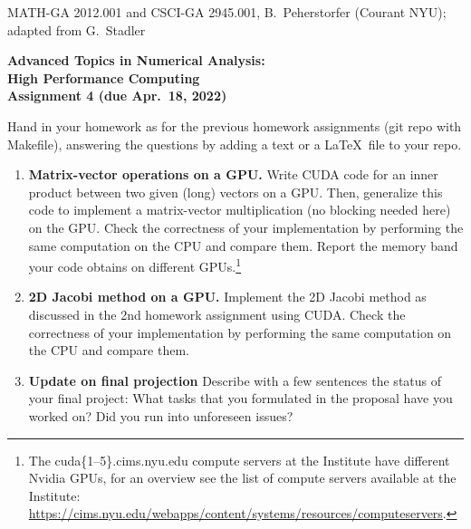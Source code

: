 \documentclass[12pt]{article}
\begin{document}
\begin{center}
  \vspace*{-2cm}
{\small MATH-GA 2012.001 and CSCI-GA 2945.001, B.~Peherstorfer (Courant NYU); adapted from G.~Stadler}\end{center}
\vspace*{.5cm}
\begin{center}
\large \textbf{%
Advanced Topics in Numerical Analysis: \\
High Performance Computing \\
Assignment 4 (due Apr.\ 18, 2022) }
\end{center}



 Hand in your homework as for
the previous homework assignments (git repo with Makefile), answering
the questions by adding a text or a \LaTeX\ file to your repo.
\\[.2ex]

\begin{enumerate}

\item {\bf Matrix-vector operations on a GPU.} Write CUDA code for an inner product between two given
  (long) vectors on a GPU. Then, generalize this code to implement a
  matrix-vector multiplication (no blocking needed here) on the
  GPU. Check the correctness of your implementation by performing the same
  computation on the CPU and compare them. Report the memory band your
  code obtains
  on different GPUs.\footnote{The cuda\{1--5\}.cims.nyu.edu compute servers at
  the Institute have different Nvidia GPUs, for an overview see the list of
  compute servers available at the Institute:
  \url{https://cims.nyu.edu/webapps/content/systems/resources/computeservers}.}

\item {\bf 2D Jacobi method on a GPU.}
  Implement the 2D Jacobi method as discussed in the 2nd homework
  assignment using CUDA. Check the correctness of your implementation by performing the same
  computation on the CPU and compare them. 
  
  \item {\bf Update on final projection}
    Describe with a few sentences the status of your final project: What tasks that you formulated in the proposal have you worked on? Did you run into unforeseen issues? 

\end{enumerate}
\end{document}
